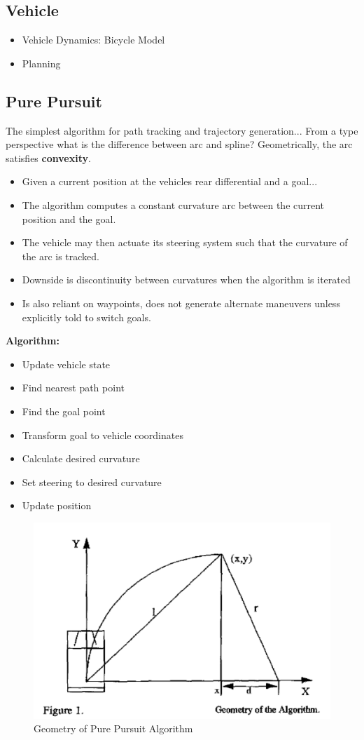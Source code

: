 \documentclass{easychair}
\theoremstyle{theorem}
\theoremstyle{remark}
\begin{document}
\subsection{Vehicle}
\begin{itemize}
	\item Vehicle Dynamics: Bicycle Model
	\item Planning
\end{itemize}

\subsection{Pure Pursuit}
The simplest algorithm for path tracking and trajectory generation...
From a type perspective what is the difference between arc and spline? 
Geometrically, the arc satisfies \textbf{convexity}. 
\begin{itemize}
	\item Given a current position at the vehicles rear differential and a goal...
	\item The algorithm computes a constant curvature arc between the current position and the goal.
	\item The vehicle may then actuate its steering system such that the curvature of the arc is tracked.
	\item Downside is discontinuity between curvatures when the algorithm is iterated
	\item Is also reliant on waypoints, does not generate alternate maneuvers unless explicitly told to switch goals. 
\end{itemize}
\textbf{Algorithm:}
\begin{itemize}
	\item Update vehicle state
	\item Find nearest path point
	\item Find the goal point
	\item Transform goal to vehicle coordinates
	\item Calculate desired curvature
	\item Set steering to desired curvature
	\item Update position
\end{itemize}
\begin{figure}
	\centering
	\includegraphics[scale=.5]{figures/pure_pursuit_geom}
	\caption{Geometry of Pure Pursuit Algorithm}
\end{figure}
\end{document}

